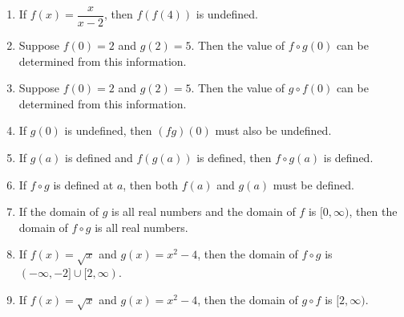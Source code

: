 \documentclass[12pt]{article}
\begin{document}
\begin{enumerate}
\begin{enumerate}
			\item If $f(x)=\dfrac{x}{x-2}$, then $f(f(4))$ is undefined.
			
			\item Suppose $f(0)=2$ and $g(2)=5$. Then the value of $f\circ g(0)$ can be determined from this information.
			
			\item Suppose $f(0)=2$ and $g(2)=5$. Then the value of $g\circ f(0)$ can be determined from this information.
				
			\item If $g(0)$ is undefined, then $(fg)(0)$ must also be undefined.
			
			\item If $g(a)$ is defined and $f(g(a))$ is defined, then $f\circ g(a)$ is defined.
			
			\item If $f\circ g$ is defined at $a$, then both $f(a)$ and $g(a)$ must be defined.
			
			\item If the domain of $g$ is all real numbers and the domain of $f$ is $[0,\infty)$, then the domain of $f\circ g$ is all real numbers.
			
			\item If $f(x)=\sqrt{x}$ and $g(x)=x^2-4$, then the domain of $f\circ g$ is $(-\infty,-2]\cup[2,\infty)$.
			
			\item If $f(x)=\sqrt{x}$ and $g(x)=x^2-4$, then the domain of $g\circ f$ is	$[2,\infty)$.		
			
		\end{enumerate}
		

\end{enumerate}
\end{document}
